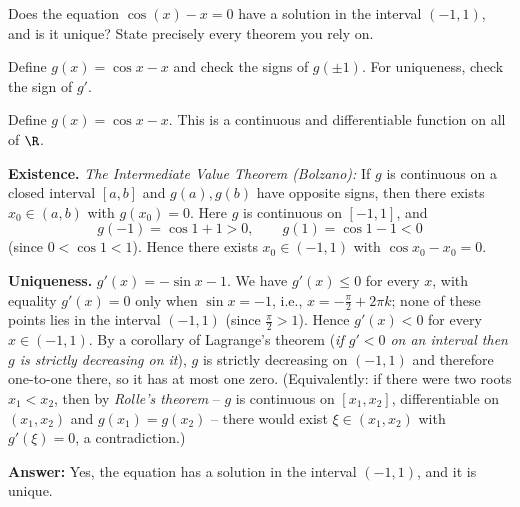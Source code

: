 
\begin{question}
Does the equation $\cos(x)-x=0$ have a solution in the interval $(-1,1)$, and is it unique? State precisely every theorem you rely on.
\end{question}

\begin{hint}
Define $g(x)=\cos x-x$ and check the signs of $g(\pm1)$. For uniqueness, check the sign of $g'$.
\end{hint}

\begin{solution}
Define $g(x)=\cos x-x$. This is a continuous and differentiable function on all of $\R$.

\textbf{Existence.} \emph{The Intermediate Value Theorem (Bolzano):} If $g$ is continuous on a closed interval $[a,b]$ and $g(a),g(b)$ have opposite signs, then there exists $x_0\in(a,b)$ with $g(x_0)=0$.
Here $g$ is continuous on $[-1,1]$, and
\[
g(-1)=\cos1+1>0,\qquad g(1)=\cos1-1<0
\]
(since $0<\cos1<1$). Hence there exists $x_0\in(-1,1)$ with $\cos x_0-x_0=0$.

\textbf{Uniqueness.} $g'(x)=-\sin x-1$. We have $g'(x)\le0$ for every $x$, with equality $g'(x)=0$ only when $\sin x=-1$, i.e., $x=-\frac\pi2+2\pi k$; none of these points lies in the interval $(-1,1)$ (since $\frac\pi2>1$). Hence $g'(x)<0$ for every $x\in(-1,1)$.
By a corollary of Lagrange's theorem (\emph{if $g'<0$ on an interval then $g$ is strictly decreasing on it}), $g$ is strictly decreasing on $(-1,1)$ and therefore one-to-one there, so it has at most one zero.
(Equivalently: if there were two roots $x_1<x_2$, then by \emph{Rolle's theorem} -- $g$ is continuous on $[x_1,x_2]$, differentiable on $(x_1,x_2)$ and $g(x_1)=g(x_2)$ -- there would exist $\xi\in(x_1,x_2)$ with $g'(\xi)=0$, a contradiction.)

\textbf{Answer:} Yes, the equation has a solution in the interval $(-1,1)$, and it is unique.
\end{solution}
